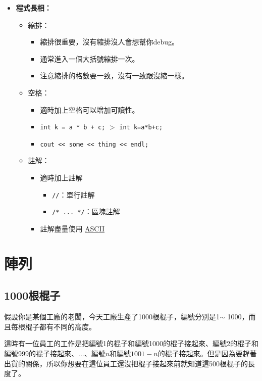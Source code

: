 \documentclass[a4paper, 11pt, oneside]{book}
\begin{document}
\begin{itemize}
    \item \textbf{程式長相：}
    \begin{itemize}
        \item 縮排：
        \begin{itemize}
            \item 縮排很重要，沒有縮排沒人會想幫你debug。
            \item 通常進入一個大括號縮排一次。
            \item 注意縮排的格數要一致，沒有一致跟沒縮一樣。
        \end{itemize}
        \item 空格：
        \begin{itemize}
            \item 適時加上空格可以增加可讀性。
            \item \texttt{int k = a * b + c;} $>$ \texttt{int k=a*b+c;}
            \item \texttt{cout << some << thing << endl;}
        \end{itemize}
        \item 註解：
        \begin{itemize}
            \item 適時加上註解
            \begin{itemize}
                \item \texttt{//}：單行註解
                \item \texttt{/* ... */}：區塊註解
            \end{itemize}
            \item 註解盡量使用 \href{https://zh.wikipedia.org/zh-tw/ASCII}{\underline{ASCII}}
        \end{itemize}
    \end{itemize}
\end{itemize}

\chapter{陣列}
\section{1000根棍子}
假設你是某個工廠的老闆，今天工廠生產了1000根棍子，編號分別是1$\sim$	1000，而且每根棍子都有不同的高度。

這時有一位員工的工作是把編號1的棍子和編號1000的棍子接起來、編號2的棍子和編號999的裩子接起來、...、編號$n$和編號$1001-n$的棍子接起來。但是因為要趕著出貨的關係，所以你想要在這位員工還沒把棍子接起來前就知道這500根棍子的長度了。
\end{document}
